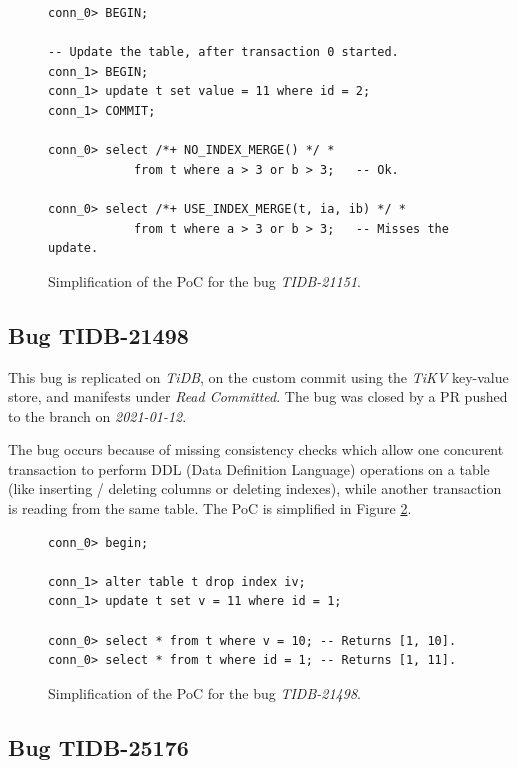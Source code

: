 \begin{figure}
\begin{verbatim}
conn_0> BEGIN;

-- Update the table, after transaction 0 started.
conn_1> BEGIN;
conn_1> update t set value = 11 where id = 2;
conn_1> COMMIT;

conn_0> select /*+ NO_INDEX_MERGE() */ *
            from t where a > 3 or b > 3;   -- Ok.

conn_0> select /*+ USE_INDEX_MERGE(t, ia, ib) */ *
            from t where a > 3 or b > 3;   -- Misses the update.
\end{verbatim}
\caption{Simplification of the PoC for the bug \textit{TIDB-21151}.} \label{fig:TIDB-21151}
\end{figure}

\subsection*{Bug TIDB-21498}

This bug is replicated on \textit{TiDB}, on the custom commit  using the \textit{TiKV} key-value store, and manifests under \textit{Read Committed}. The bug was closed by a PR pushed to the  branch on \textit{2021-01-12}.

The bug occurs because of missing consistency checks which allow one concurent transaction to perform DDL (Data Definition Language) operations on a table (like inserting / deleting columns or deleting indexes), while another transaction is reading from the same table. The PoC is simplified in Figure \ref{fig:TIDB-21498}.

\begin{figure}
\begin{verbatim}
conn_0> begin;

conn_1> alter table t drop index iv;
conn_1> update t set v = 11 where id = 1;

conn_0> select * from t where v = 10; -- Returns [1, 10].
conn_0> select * from t where id = 1; -- Returns [1, 11].
\end{verbatim}
\caption{Simplification of the PoC for the bug \textit{TIDB-21498}.} \label{fig:TIDB-21498}
\end{figure}

\subsection*{Bug TIDB-25176}

